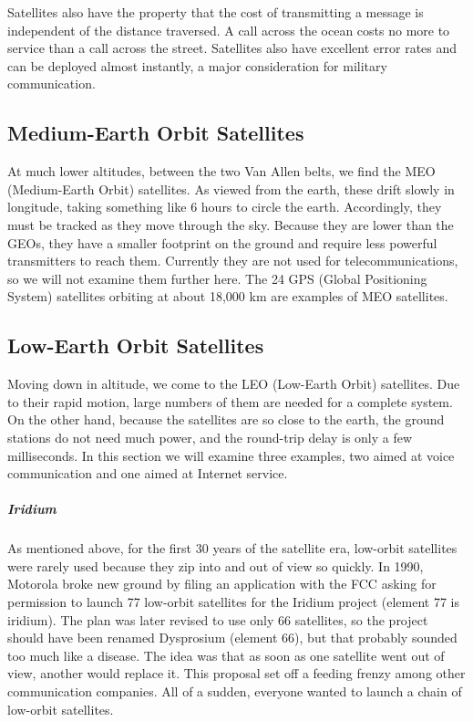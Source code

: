 Satellites also have the property that the cost of transmitting a
message is independent of the distance traversed. A call across the
ocean costs no more to service than a call across the street. Satellites
also have excellent error rates and can be deployed almost instantly, a
major consideration for military communication.

\protect\hypertarget{0130661023_ch02lev1sec4.htmlux5cux23ch02lev2sec14}{}{}

\subsection{Medium-Earth Orbit Satellites}

At much lower altitudes, between the two Van Allen belts, we find the
{MEO} ({Medium-Earth Orbit}) satellites. As viewed from the earth, these
drift slowly in longitude, taking something like 6 hours to circle the
earth. Accordingly, they must be tracked as they move through the sky.
Because they are lower than the GEOs, they have a smaller footprint on
the ground and require less powerful transmitters to reach them.
Currently they are not used for telecommunications, so we will not
examine them further here. The 24 {GPS} ({Global Positioning System})
satellites orbiting at about 18,000 km are examples of MEO satellites.

\protect\hypertarget{0130661023_ch02lev1sec4.htmlux5cux23ch02lev2sec15}{}{}

\subsection{Low-Earth Orbit Satellites}

Moving down in altitude, we come to the {LEO} ({Low-Earth Orbit})
satellites. Due to their rapid motion, large numbers of them are needed
for a complete system. On the other hand, because the satellites are so
close to the earth, the ground stations do not need much power, and the
round-trip delay is only a few milliseconds. In this section we will
examine three examples, two aimed at voice communication and one aimed
at Internet service.

\protect\hypertarget{0130661023_ch02lev1sec4.htmlux5cux23ch02lev3sec6}{}{}

\subparagraph{Iridium}

As mentioned above, for the first 30 years of the satellite era,
low-orbit satellites were rarely used because they zip into and out of
view so quickly. In 1990, Motorola broke new ground by filing an
application with the FCC asking for permission to launch 77 low-orbit
satellites for the Iridium project (element 77 is iridium). The plan was
later revised to use only 66 satellites, so the project should have been
renamed Dysprosium (element 66), but that probably sounded too much like
a disease. The idea was that as soon as one satellite went out of view,
another would replace it. This proposal set off a feeding frenzy among
other communication companies. All of a sudden, everyone wanted to
launch a chain of low-orbit satellites.

